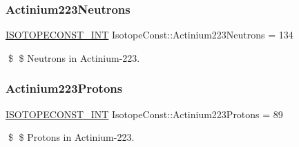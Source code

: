 \subsubsection{\texorpdfstring{Actinium223\+Neutrons}{Actinium223Neutrons}}
{\footnotesize\ttfamily \mbox{\hyperlink{group___isotope_const-_macros_ga5f18360b3e99483a35c32d789e62621c}{I\+S\+O\+T\+O\+P\+E\+C\+O\+N\+S\+T\+\_\+\+I\+NT}} Isotope\+Const\+::\+Actinium223\+Neutrons = 134}

\$ \$ Neutrons in Actinium-\/223. \mbox{\label{group___isotope_const-_actinium-_ac223_gacc7bc82acb47b77a9cfbb102fde35ecb}} 
\subsubsection{\texorpdfstring{Actinium223\+Protons}{Actinium223Protons}}
{\footnotesize\ttfamily \mbox{\hyperlink{group___isotope_const-_macros_ga5f18360b3e99483a35c32d789e62621c}{I\+S\+O\+T\+O\+P\+E\+C\+O\+N\+S\+T\+\_\+\+I\+NT}} Isotope\+Const\+::\+Actinium223\+Protons = 89}

\$ \$ Protons in Actinium-\/223. 